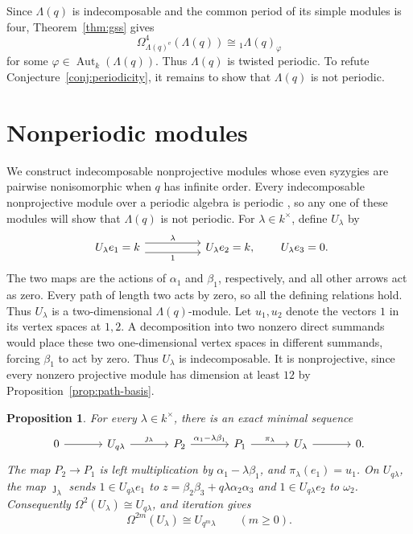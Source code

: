 \documentclass[a4paper,reqno,10pt]{amsart}
\newtheorem{proposition}[theorem]{Proposition}
\theoremstyle{definition}
\numberwithin{equation}{section}
\newcommand{\kfield}{k}
\newcommand{\Aut}{\operatorname{Aut}}
\newcommand{\ee}{\mathrm e}
\begin{document}
Since $\Lambda(q)$ is indecomposable and the common period of its simple
modules is four, Theorem~\ref{thm:gss} gives
\begin{equation}
 \Omega^4_{\Lambda(q)^{\ee}}(\Lambda(q))
 \cong{}_1\Lambda(q)_\varphi
 \label{eq:twisted-period}
\end{equation}
for some $\varphi\in\Aut_\kfield(\Lambda(q))$. Thus $\Lambda(q)$ is
twisted periodic. To refute Conjecture~\ref{conj:periodicity}, it remains
to show that $\Lambda(q)$ is not periodic.

\section{Nonperiodic modules}
\label{sec:nonperiodic-module}

We construct indecomposable nonprojective modules whose even syzygies are
pairwise nonisomorphic when $q$ has infinite order. Every indecomposable
nonprojective module over a periodic algebra is periodic
\cite[Theorem~IV.11.19(ii)]{SkowronskiYamagata}, so any one of these modules
will show that $\Lambda(q)$ is not periodic. For $\lambda\in\kfield^\times$,
define $U_\lambda$ by
\[
\begin{tikzcd}[column sep=5em]
U_\lambda e_1=\kfield
 \arrow[r,shift left=1ex,"\lambda"]
 \arrow[r,shift right=1ex,"1"']
&
U_\lambda e_2=\kfield,
\end{tikzcd}
\qquad
U_\lambda e_3=0.
\]
The two maps are the actions of $\alpha_1$ and $\beta_1$, respectively, and
all other arrows act as zero. Every path of length two acts by zero,
so all the defining relations hold. Thus $U_\lambda$ is a two-dimensional
$\Lambda(q)$-module. Let $u_1,u_2$ denote the vectors $1$ in its vertex
spaces at $1,2$.
A decomposition into two nonzero direct summands would place these
two one-dimensional vertex spaces in different summands, forcing
$\beta_1$ to act by zero. Thus $U_\lambda$ is indecomposable. It is
nonprojective, since every nonzero projective module has dimension at least
$12$ by Proposition~\ref{prop:path-basis}.

\begin{proposition}
\label{prop:module-resolution}
For every $\lambda\in\kfield^\times$, there is an exact minimal sequence
\[
\begin{tikzcd}[column sep=3.4em]
0 \arrow[r] &
U_{q\lambda} \arrow[r,"\jmath_\lambda"] &
P_2 \arrow[r,"\alpha_1-\lambda\beta_1"] &
P_1 \arrow[r,"\pi_\lambda"] &
U_\lambda \arrow[r] &
0 .
\end{tikzcd}
\]
The map $P_2\to P_1$ is left multiplication by
$\alpha_1-\lambda\beta_1$, and $\pi_\lambda(e_1)=u_1$. On $U_{q\lambda}$, the map
$\jmath_\lambda$ sends $1\in U_{q\lambda}e_1$ to
$z=\beta_2\beta_3+q\lambda\alpha_2\alpha_3$ and
$1\in U_{q\lambda}e_2$ to $\omega_2$.
Consequently $\Omega^2(U_\lambda)\cong U_{q\lambda}$, and iteration gives
\begin{equation}
 \Omega^{2m}(U_\lambda)\cong U_{q^m\lambda}
 \qquad (m\geq0).
 \label{eq:syzygy-drift}
\end{equation}
\end{proposition}
\end{document}
